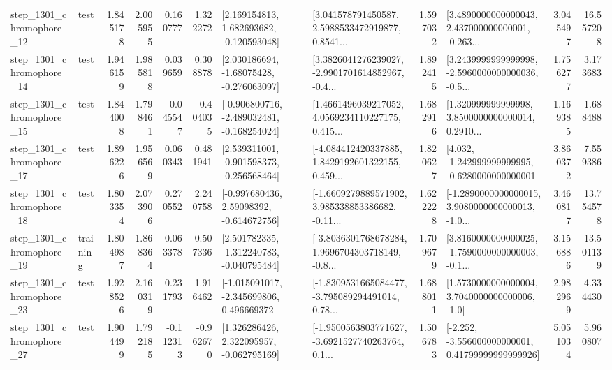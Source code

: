 \begin{tabular}{llrrrrllrlrr}
 step\_1301\_chromophore\_12 &      test &      1.845178 &    2.005955 &      0.160777 &  1.322272 &    [2.169154813, 1.682693682, -0.120593048] &  [3.041578791450587, 2.5988533472919877, 0.8541... &       1.597032 &  [3.4890000000000043, 2.437000000000001, -0.263... &            3.045497 &         16.557208 \\
 step\_1301\_chromophore\_14 &      test &      1.946159 &    1.985818 &      0.039659 &  0.308878 &    [2.030186694, -1.68075428, -0.276063097] &  [3.3826041276239027, -2.9901701614852967, -0.4... &       1.892415 &  [3.2439999999999998, -2.5960000000000036, -0.5... &            1.756277 &          3.173683 \\
 step\_1301\_chromophore\_15 &      test &      1.844008 &    1.798461 &     -0.045547 & -0.404035 &  [-0.906800716, -2.489032481, -0.168254024] &  [1.4661496039217052, 4.0569234110227175, 0.415... &       1.682916 &  [1.320999999999998, 3.8500000000000014, 0.2910... &            1.169385 &          1.688488 \\
 step\_1301\_chromophore\_17 &      test &      1.896226 &    1.956569 &      0.060343 &  0.481941 &   [2.539311001, -0.901598373, -0.256568464] &  [-4.084412420337885, 1.8429192601322155, 0.459... &       1.820627 &   [4.032, -1.242999999999995, -0.6280000000000001] &            3.860372 &          7.559386 \\
 step\_1301\_chromophore\_18 &      test &      1.803354 &    2.073906 &      0.270552 &  2.240758 &    [-0.997680436, 2.59098392, -0.614672756] &  [-1.6609279889571902, 3.985338853386682, -0.11... &       1.622228 &  [-1.2890000000000015, 3.9080000000000013, -1.0... &            3.460817 &         13.754578 \\
 step\_1301\_chromophore\_19 &  training &      1.804987 &    1.868364 &      0.063378 &  0.507336 &   [2.501782335, -1.312240783, -0.040795484] &  [-3.8036301768678284, 1.9696704303718149, -0.8... &       1.709679 &  [3.8160000000000025, -1.7590000000000003, -0.1... &            3.156886 &         13.501139 \\
 step\_1301\_chromophore\_23 &      test &      1.928526 &    2.160319 &      0.231793 &  1.916462 &   [-1.015091017, -2.345699806, 0.496669372] &  [-1.8309531665084477, -3.795089294491014, 0.78... &       1.688011 &     [1.5730000000000004, 3.7040000000000006, -1.0] &            2.982969 &          4.334430 \\
 step\_1301\_chromophore\_27 &      test &      1.904499 &    1.792185 &     -0.112313 & -0.962670 &    [1.326286426, 2.322095957, -0.062795169] &  [-1.9500563803771627, -3.6921527740263764, 0.1... &       1.506783 &  [-2.252, -3.556000000000001, 0.41799999999999926] &            5.051034 &          5.960807 \\

\end{tabular}
